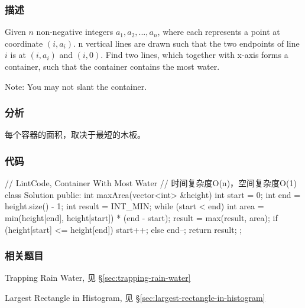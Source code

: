 \subsubsection{描述}
Given $n$ non-negative integers $a_1, a_2, ..., a_n$, where each represents a point at coordinate $(i, a_i)$. n vertical lines are drawn such that the two endpoints of line $i$ is at $(i, a_i)$ and $(i, 0)$. Find two lines, which together with x-axis forms a container, such that the container contains the most water.

Note: You may not slant the container.


\subsubsection{分析}
每个容器的面积，取决于最短的木板。


\subsubsection{代码}
\begin{Code}
// LintCode, Container With Most Water
// 时间复杂度O(n)，空间复杂度O(1)
class Solution {
public:
    int maxArea(vector<int> &height) {
        int start = 0;
        int end = height.size() - 1;
        int result = INT_MIN;
        while (start < end) {
            int area = min(height[end], height[start]) * (end - start);
            result = max(result, area);
            if (height[start] <= height[end]) {
                start++;
            } else {
                end--;
            }
        }
        return result;
    }
};
\end{Code}


\subsubsection{相关题目}
\begindot
\item Trapping Rain Water, 见 \S \ref{sec:trapping-rain-water}
\item Largest Rectangle in Histogram, 见 \S \ref{sec:largest-rectangle-in-histogram}
\myenddot
